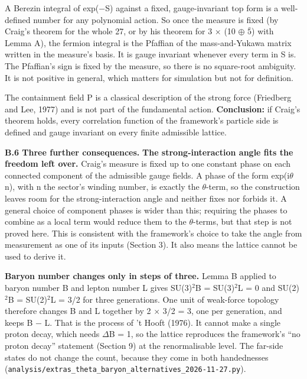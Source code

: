 \documentclass[
  11pt,
]{article}
\begin{document}
A Berezin integral of exp(\ensuremath{-}S) against a fixed, gauge-invariant top form is a well-defined number for any polynomial action. So once the measure is fixed (by Craig's theorem for the whole 27, or by his theorem for 3 \ensuremath{\times} (10 \ensuremath{\oplus} \ensuremath{\bar{5}}) with Lemma A), the fermion integral is the Pfaffian of the mass-and-Yukawa matrix written in the measure's basis. It is gauge invariant whenever every term in S is. The Pfaffian's sign is fixed by the measure, so there is no square-root ambiguity. It is not positive in general, which matters for simulation but not for definition.

The containment field P is a classical description of the strong force (Friedberg and Lee, 1977) and is not part of the fundamental action. \textbf{Conclusion:} if Craig's theorem holds, every correlation function of the framework's particle side is defined and gauge invariant on every finite admissible lattice.

\textbf{B.6 Three further consequences.} \textbf{The strong-interaction angle fits the freedom left over.} Craig's measure is fixed up to one constant phase on each connected component of the admissible gauge fields. A phase of the form exp(i\ensuremath{\theta}n), with n the sector's winding number, is exactly the \ensuremath{\theta}-term, so the construction leaves room for the strong-interaction angle and neither fixes nor forbids it. A general choice of component phases is wider than this; requiring the phases to combine as a local term would reduce them to the \ensuremath{\theta}-terms, but that step is not proved here. This is consistent with the framework's choice to take the angle from measurement as one of its inputs (Section 3). It also means the lattice cannot be used to derive it.

\textbf{Baryon number changes only in steps of three.} Lemma B applied to baryon number B and lepton number L gives SU(3)\ensuremath{^{2}}B = SU(3)\ensuremath{^{2}}L = 0 and SU(2)\ensuremath{^{2}}B = SU(2)\ensuremath{^{2}}L = 3/2 for three generations. One unit of weak-force topology therefore changes B and L together by 2 \ensuremath{\times} 3/2 = 3, one per generation, and keeps B \ensuremath{-} L. That is the process of 't Hooft (1976). It cannot make a single proton decay, which needs \ensuremath{\Delta}B = 1, so the lattice reproduces the framework's ``no proton decay'' statement (Section 9) at the renormalisable level. The far-side states do not change the count, because they come in both handednesses (\texttt{analysis/extras\_theta\_baryon\_alternatives\_2026-11-27.py}).
\end{document}
